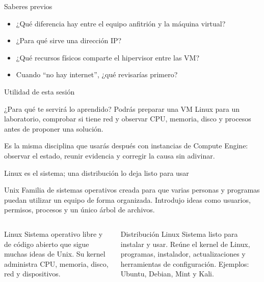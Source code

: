 \documentclass[aspectratio=169,10pt,c]{beamer}
\begin{document}
\begin{frame}{Saberes previos}
\begin{itemize}\setlength\itemsep{10pt}
  \item ¿Qué diferencia hay entre el equipo anfitrión y la máquina virtual?
  \item ¿Para qué sirve una dirección IP?
  \item ¿Qué recursos físicos comparte el hipervisor entre las VM?
  \item Cuando ``no hay internet'', ¿qué revisarías primero?
\end{itemize}
\end{frame}

\begin{frame}{Utilidad de esta sesión}
\begin{block}{¿Para qué te servirá lo aprendido?}
Podrás preparar una VM Linux para un laboratorio, comprobar si tiene red y observar CPU, memoria, disco y procesos antes de proponer una solución.
\end{block}
\vspace{0.2cm}
\small Es la misma disciplina que usarás después con instancias de Compute Engine: observar el estado, reunir evidencia y corregir la causa sin adivinar.
\end{frame}

\begin{frame}{Linux es el sistema; una distribución lo deja listo para usar}
\begin{block}{Unix}
\small Familia de sistemas operativos creada para que varias personas y programas puedan utilizar un equipo de forma organizada. Introdujo ideas como usuarios, permisos, procesos y un único árbol de archivos.
\end{block}
\begin{columns}[T,onlytextwidth]
\begin{block}{Linux}
\small Sistema operativo libre y de código abierto que sigue muchas ideas de Unix. Su kernel administra CPU, memoria, disco, red y dispositivos.
\end{block}
\begin{exampleblock}{Distribución Linux}
\small Sistema listo para instalar y usar. Reúne el kernel de Linux, programas, instalador, actualizaciones y herramientas de configuración. Ejemplos: Ubuntu, Debian, Mint y Kali.
\end{exampleblock}
\end{columns}
\end{frame}
\end{document}
